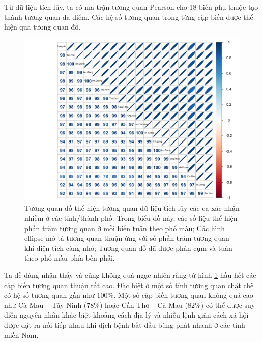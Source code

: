 \documentclass[../thesis.tex]{subfiles}
\begin{document}
\newpage

Từ dữ liệu tích lũy, ta có ma trận tương quan Pearson cho 18 biến phụ thuộc tạo thành tương quan đa điểm. Các hệ số tương quan trong từng cặp biến được thể hiện qua tương quan đồ.

\begin{Shaded}
	\begin{Highlighting}[]
\SpecialCharTok{::}\OtherTok{\textless{}{-}} \SpecialCharTok{\%\textgreater{}\%} \NormalTok{()}\NormalTok{, }
		 \NormalTok{, }
		 \NormalTok{, }
		\NormalTok{,}
		 \NormalTok{,}
		\NormalTok{)}
	\end{Highlighting}
\end{Shaded}
\begin{figure}[H]
	\centering
	\includegraphics[width=0.8\linewidth]{images/corr_cul}
	\caption[Tương quan đồ thể hiện tương quan dữ liệu tích lũy các ca xác nhận nhiễm]{Tương quan đồ thể hiện tương quan dữ liệu tích lũy các ca xác nhận nhiễm ở các tỉnh/thành phố. Trong biểu đồ này, các số liệu thể hiện phần trăm tương quan ở mỗi biến tuân theo phổ màu; Các hình ellipse mô tả tương quan thuận ứng với số phần trăm tương quan khi diện tích càng nhỏ; Tương quan đồ đã được phân cụm và tuân theo phổ màu phía bên phải.}
	\label{fig:corrcul}
\end{figure}


Ta dễ dàng nhận thấy và cũng không quá ngạc nhiên rằng từ hình \ref{fig:corrcul} hầu hết các cặp biến tương quan thuận rất cao. Đặc biệt ở một số tỉnh tương quan chặt chẽ có hệ số tương quan gần như $ 100\% $. Một số cặp biến tương quan không quá cao như Cà Mau -- Tây Ninh ($ 78\% $) hoặc Cần Thơ -- Cà Mau ($ 82\% $) có thể được suy diễn nguyên nhân khác biệt khoảng cách địa lý và nhiều lệnh giãn cách xã hội được đặt ra nối tiếp nhau khi dịch bệnh bắt đầu bùng phát nhanh ở các tỉnh miền Nam. 
\end{document}
